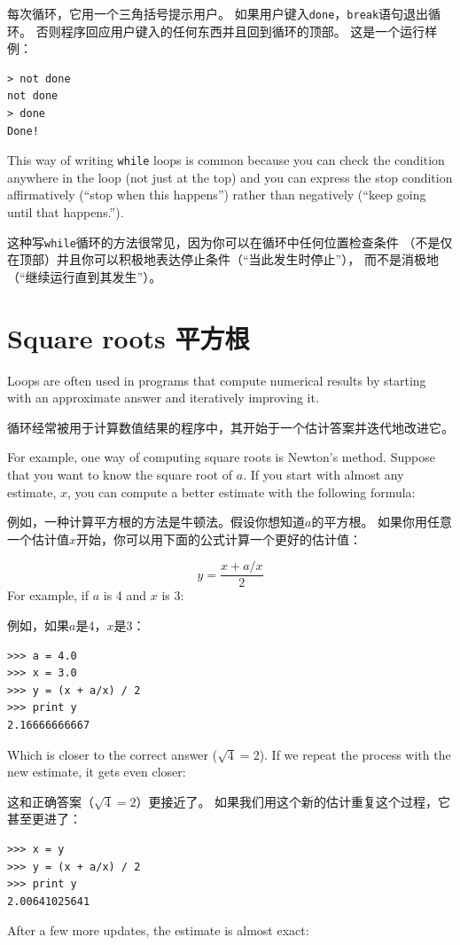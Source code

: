 \documentclass[10pt]{book}
\begin{document}
\begin{CJK}{UTF8}{gbsn}
每次循环，它用一个三角括号提示用户。
如果用户键入{\tt done}，{\tt break}语句退出循环。
否则程序回应用户键入的任何东西并且回到循环的顶部。
这是一个运行样例：

\begin{verbatim}
> not done
not done
> done
Done!
\end{verbatim}
%
This way of writing {\tt while} loops is common because you
can check the condition anywhere in the loop (not just at the
top) and you can express the stop condition affirmatively
(``stop when this happens'') rather than negatively (``keep going
until that happens.'').

这种写{\tt while}循环的方法很常见，因为你可以在循环中任何位置检查条件
（不是仅在顶部）并且你可以积极地表达停止条件（``当此发生时停止''），
而不是消极地（``继续运行直到其发生''）。


\section{Square roots 平方根}
\label{squareroot}

Loops are often used in programs that compute
numerical results by starting with an approximate answer and
iteratively improving it.

循环经常被用于计算数值结果的程序中，其开始于一个估计答案并迭代地改进它。

For example, one way of computing square roots is Newton's method.
Suppose that you want to know the square root of $a$.  If you start
with almost any estimate, $x$, you can compute a better
estimate with the following formula:

例如，一种计算平方根的方法是牛顿法。假设你想知道$a$的平方根。
如果你用任意一个估计值$x$开始，你可以用下面的公式计算一个更好的估计值：

\[ y = \frac{x + a/x}{2} \]
%
For example, if $a$ is 4 and $x$ is 3:

例如，如果$a$是4，$x$是3：

\begin{verbatim}
>>> a = 4.0
>>> x = 3.0
>>> y = (x + a/x) / 2
>>> print y
2.16666666667
\end{verbatim}
%
Which is closer to the correct answer ($\sqrt{4} = 2$).  If we
repeat the process with the new estimate, it gets even closer:

这和正确答案（$\sqrt{4} = 2$）更接近了。
如果我们用这个新的估计重复这个过程，它甚至更进了：

\begin{verbatim}
>>> x = y
>>> y = (x + a/x) / 2
>>> print y
2.00641025641
\end{verbatim}
%
After a few more updates, the estimate is almost exact:


\end{CJK}
\end{document}
